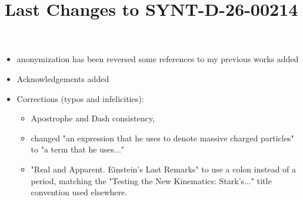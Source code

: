 \documentclass[submitted,11pt]{article}
\title{Last Changes to SYNT-D-26-00214}
\begin{document}
\maketitle

\begin{itemize}
\item anonymization has been reversed some references to my previous works added
\item Acknowledgements added
\item Corrections (typos and infelicities): 
\begin{itemize}
\item Apostrophe and Dash consistency, 
\item changed "an expression that he uses to denote massive charged particles" to "a term that he uses..." 
\item "Real and Apparent. Einstein's Last Remarks" to use a colon instead of a period, matching the "Testing the New Kinematics: Stark's..." title convention used elsewhere.
\end{itemize}

\end{itemize}
\end{document}

